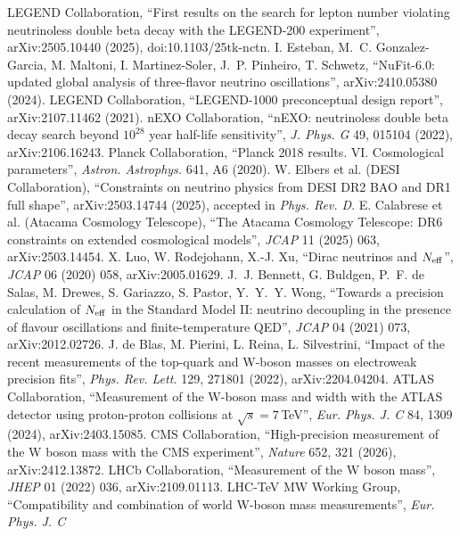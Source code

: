  LEGEND Collaboration, ``First results on the search for lepton number violating neutrinoless double beta decay with the
LEGEND-200 experiment'', arXiv:2505.10440 (2025), doi:10.1103/25tk-nctn.
 I. Esteban, M.~C. Gonzalez-Garcia, M. Maltoni, I. Martinez-Soler, J.~P. Pinheiro, T. Schwetz, ``NuFit-6.0: updated
global analysis of three-flavor neutrino oscillations'', arXiv:2410.05380 (2024).
 LEGEND Collaboration, ``LEGEND-1000 preconceptual design report'', arXiv:2107.11462 (2021).
 nEXO Collaboration, ``nEXO: neutrinoless double beta decay search beyond $10^{28}$ year half-life sensitivity'', \emph{J. Phys.
G} 49, 015104 (2022), arXiv:2106.16243.
 Planck Collaboration, ``Planck 2018 results. VI. Cosmological parameters'', \emph{Astron. Astrophys.} 641, A6 (2020).
 W. Elbers et al. (DESI Collaboration), ``Constraints on neutrino physics from DESI DR2 BAO and DR1 full shape'',
arXiv:2503.14744 (2025), accepted in \emph{Phys. Rev. D}.
 E. Calabrese et al. (Atacama Cosmology Telescope), ``The Atacama Cosmology Telescope: DR6 constraints on extended
cosmological models'', \emph{JCAP} 11 (2025) 063, arXiv:2503.14454.
 X. Luo, W. Rodejohann, X.-J. Xu, ``Dirac neutrinos and $N_{\rm eff}$'', \emph{JCAP} 06 (2020) 058, arXiv:2005.01629.
 J.~J. Bennett, G. Buldgen, P.~F. de Salas, M. Drewes, S. Gariazzo, S. Pastor, Y.~Y.~Y. Wong, ``Towards a precision
calculation of $N_{\rm eff}$ in the Standard Model II: neutrino decoupling in the presence of flavour oscillations and finite-temperature
QED'', \emph{JCAP} 04 (2021) 073, arXiv:2012.02726.
 J. de Blas, M. Pierini, L. Reina, L. Silvestrini, ``Impact of the recent measurements of the top-quark and W-boson masses
on electroweak precision fits'', \emph{Phys. Rev. Lett.} 129, 271801 (2022), arXiv:2204.04204.
 ATLAS Collaboration, ``Measurement of the W-boson mass and width with the ATLAS detector using proton-proton collisions at
$\sqrt{s}=7$\,TeV'', \emph{Eur. Phys. J. C} 84, 1309 (2024), arXiv:2403.15085.
 CMS Collaboration, ``High-precision measurement of the W boson mass with the CMS experiment'', \emph{Nature} 652, 321 (2026),
arXiv:2412.13872.
 LHCb Collaboration, ``Measurement of the W boson mass'', \emph{JHEP} 01 (2022) 036, arXiv:2109.01113.
 LHC-TeV MW Working Group, ``Compatibility and combination of world W-boson mass measurements'', \emph{Eur. Phys. J. C}

